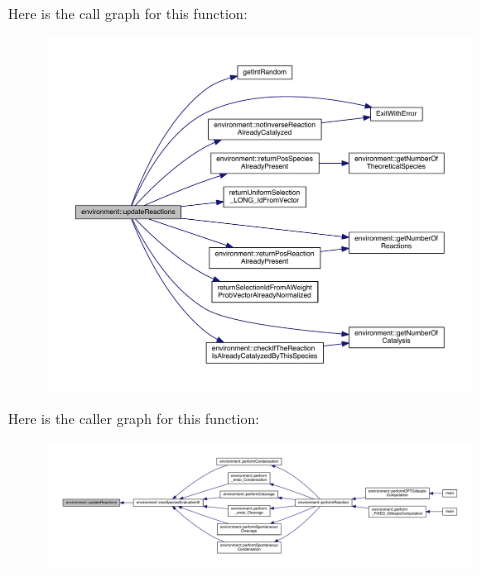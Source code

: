 Here is the call graph for this function\+:\nopagebreak
\begin{figure}[H]
\begin{center}
\leavevmode
\includegraphics[width=350pt]{a00013_ace92235425bfbe692e3873ba5bb07639_cgraph}
\end{center}
\end{figure}




Here is the caller graph for this function\+:\nopagebreak
\begin{figure}[H]
\begin{center}
\leavevmode
\includegraphics[width=350pt]{a00013_ace92235425bfbe692e3873ba5bb07639_icgraph}
\end{center}
\end{figure}


